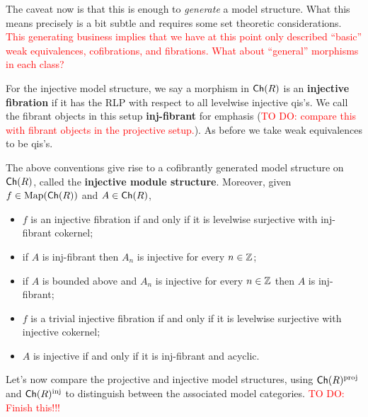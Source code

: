 \documentclass[11pt]{article}
\DeclareMathOperator{\iinj}{inj}
\DeclareMathOperator{\pproj}{proj}
\begin{document}
The caveat now is that this is enough to \emph{generate} a model structure. What this means precisely is a bit subtle and requires some set theoretic considerations. \textcolor{red}{This generating business implies that we have at this point only described ``basic'' weak equivalences, cofibrations, and fibrations. What about ``general'' morphisms in each class?}

For the injective model structure, we say a morphism in $\operatorname{\mathsf{Ch}}(R)$ is an \textbf{injective fibration} if it has the RLP with respect to all levelwise injective qis's. We call the fibrant objects in this setup \textbf{inj-fibrant} for emphasis (\textcolor{red}{TO DO: compare this with fibrant objects in the projective setup.}). As before we take weak equivalences to be qis's.

\begin{theorem}
The above conventions give rise to a cofibrantly generated model structure on $\operatorname{\mathsf{Ch}}(R)$, called the \textbf{injective module structure}. Moreover, given $f\in\operatorname{Map}(\operatorname{\mathsf{Ch}}(R))$ and $A\in\operatorname{\mathsf{Ch}}(R)$,
\begin{itemize}
\item $f$ is an injective fibration if and only if it is levelwise surjective with inj-fibrant cokernel;

\item if $A$ is inj-fibrant then $A_n$ is injective for every $n\in\mathbb{Z}$;

\item if $A$ is bounded above and $A_n$ is injective for every $n\in\mathbb{Z}$ then $A$ is inj-fibrant;

\item $f$ is a trivial injective fibration if and only if it is levelwise surjective with injective cokernel;

\item $A$ is injective if and only if it is inj-fibrant and acyclic.
\end{itemize}
\end{theorem}

Let's now compare the projective and injective model structures, using $\Ch(R)^{\pproj}$ and $\Ch(R)^{\iinj}$ to distinguish between the associated model categories. \textcolor{red}{TO DO: Finish this!!!}
\end{document}
